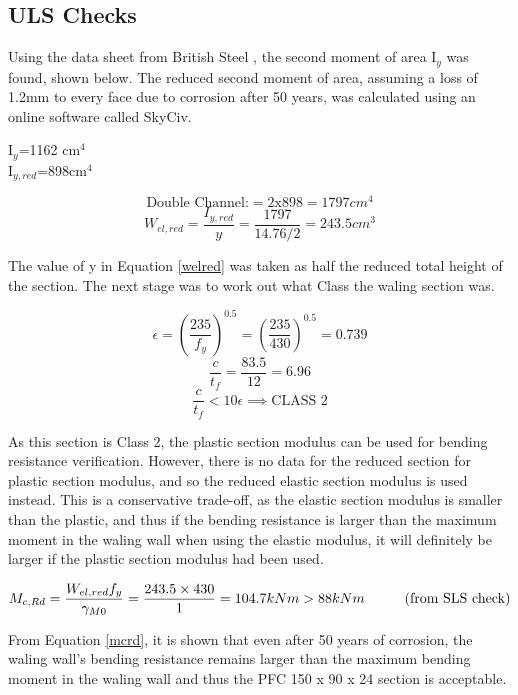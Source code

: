 \documentclass[12pt, a4paper]{article}
\begin{document}
\subsection{ULS Checks}
\begin{justify}
Using the data sheet from British Steel \cite{f}, the second moment of area I$_y$ was found, shown below. The reduced second moment of area, assuming a loss of 1.2mm to every face due to corrosion after 50 years, was calculated using an online software called SkyCiv. 
\end{justify}

\begin{justify}
\hspace*{8cm}
I$_y$=1162 cm$^4$ \\
\hspace*{8cm}
I$_{y, red}$=898cm$^4$
\end{justify}
\begin{equation}
    \text{Double Channel:}=2 \text{x} 898=1797cm^4
\end{equation}
\begin{equation}
    W_{el,red}=\frac{I_{y,red}}{y}=\frac{1797}{14.76/2}=243.5 cm^3
    \label{welred}
\end{equation}
\begin{justify}
The value of y in Equation \ref{welred} was taken as half the reduced total height of the section. The next stage was to work out what Class the waling section was. 
\end{justify}
\begin{equation}
    \epsilon=\left(\frac{235}{f_y}\right)^{0.5}=\left(\frac{235}{430}\right)^{0.5}=0.739
\end{equation}
\begin{equation}
    \frac{c}{t_f}=\frac{83.5}{12}=6.96
\end{equation}
\begin{equation}
    \frac{c}{t_f}<10\epsilon \implies \text{CLASS 2}
\end{equation}
\begin{justify}
As this section is Class 2, the plastic section modulus can be used for bending resistance verification. However, there is no data for the reduced section for plastic section modulus, and so the reduced elastic section modulus is used instead. This is a conservative trade-off, as the elastic section modulus is smaller than the plastic, and thus if the bending resistance is larger than the maximum moment in the waling wall when using the elastic modulus, it will definitely be larger if the plastic section modulus had been used.
\end{justify}
\begin{equation}
    M_{c,Rd}=\frac{W_{el,red}f_y}{\gamma_{M0}}=\frac{243.5\times430}{1}=104.7kNm>88kNm \hspace*{1cm}\text{(from SLS check)}
    \label{mcrd}
\end{equation}
\begin{justify}
From Equation \ref{mcrd}, it is shown that even after 50 years of corrosion, the waling wall's bending resistance remains larger than the maximum bending moment in the waling wall and thus the PFC 150 x 90 x 24 section is acceptable.
\end{justify}
\end{document}
